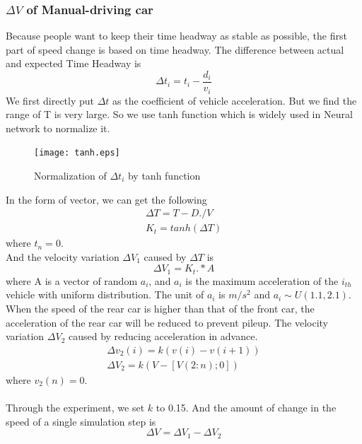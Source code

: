 \documentclass{mcmthesis}
\begin{document}
\subsubsection{$\Delta V$ of Manual-driving car}
Because people want to keep their time headway as stable as possible, the first part of speed change is based on time headway. The difference between actual and expected Time Headway is
\begin{equation}
	\Delta t_{i}=t_{i}-\frac{d_{i}}{v_{i}}
\end{equation}
\indent We first directly put $\Delta t$ as the coefficient of vehicle acceleration. But we find the range of T is very large. So we use tanh function which is widely used in Neural network to normalize it.\\
\begin{figure}[H]
	\centerline{\texttt{[image: tanh.eps]}}
	\caption{Normalization of $\Delta t_{i}$ by tanh function}
\end{figure}
\indent In the form of vector, we can get the following
\begin{equation}
\begin{split}
	\Delta T=T-D./V\\
	K_{t}= tanh(\Delta T) 
\end{split}
\end{equation}
where $t_n=0$.\\
\indent And the velocity variation $\Delta V_{1}$ caused by $\Delta T$ is
\begin{equation}
	\Delta V_{1}=K_{t}.*A
\end{equation}
\indent where A is a vector of random $a_{i}$, and $a_{i}$ is the maximum acceleration of the $i_{th}$ vehicle with uniform distribution. The unit of $a_{i}$ is $m/s^{2}$ and $a_{i}\sim U(1.1,2.1)$.\\
\indent When the speed of the rear car is higher than that of the front car, the acceleration of the rear car will be reduced to prevent pileup. The velocity variation $\Delta V_{2}$ caused by reducing acceleration in advance.
\begin{equation}
\begin{split}
	\Delta v_{2}(i)=k(v(i)-v(i+1))\\
	\Delta V_{2}=k(V-[V(2:n);0])
\end{split}
\end{equation}
where $v_2(n)=0$.\\
\\Through the experiment, we set $k$ to 0.15. And the amount of change in the speed of a single simulation step is
\begin{equation}
\Delta V=\Delta V_1-\Delta V_2
\end{equation}
\end{document}
